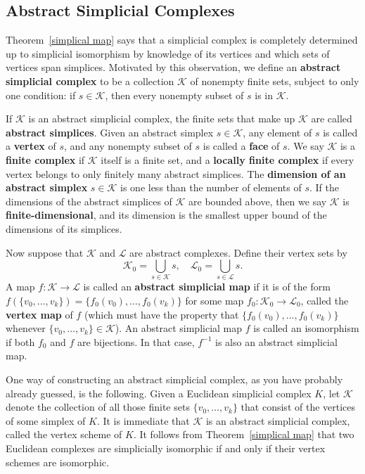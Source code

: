 \subsection{Abstract Simplicial Complexes}
Theorem~\ref{simplical map} says that a simplicial complex is completely determined up to simplicial isomorphism by knowledge of its vertices and which sets of vertices span simplices. Motivated by this observation, we define an \textbf{abstract simplicial complex} to be a collection $\mathcal{K}$ of nonempty finite sets, subject to only one condition: if $s\in\mathcal{K}$, then every nonempty subset of $s$ is in $\mathcal{K}$.\par
If $\mathcal{K}$ is an abstract simplicial complex, the finite sets that make up $\mathcal{K}$ are called \textbf{abstract simplices}. Given an abstract simplex $s\in\mathcal{K}$, any element of $s$ is called a \textbf{vertex} of $s$, and any nonempty subset of $s$ is called a \textbf{face} of $s$. We say $\mathcal{K}$ is a \textbf{finite complex} if $\mathcal{K}$ itself is a finite set, and a \textbf{locally finite complex} if every vertex belongs to only finitely many abstract simplices. The \textbf{dimension of an abstract simplex} $s\in\mathcal{K}$ is one less than the number of elements of $s$. If the dimensions of the abstract simplices of $\mathcal{K}$ are bounded above, then we say $\mathcal{K}$ is \textbf{finite-dimensional}, and its dimension is the smallest upper bound of the dimensions of its simplices.\par
Now suppose that $\mathcal{K}$ and $\mathcal{L}$ are abstract complexes. Define their vertex sets by
\[\mathcal{K}_0=\bigcup_{s\in\mathcal{K}}s,\quad \mathcal{L}_0=\bigcup_{s\in\mathcal{L}}s.\]
A map $f:\mathcal{K}\to\mathcal{L}$ is called an \textbf{abstract simplicial map} if it is of the form $f(\{v_0,\dots,v_k\})=\{f_0(v_0),\dots,f_0(v_k)\}$ for some map $f_0:\mathcal{K}_0\to\mathcal{L}_0$, called the \textbf{vertex map} of $f$ (which must have the property that $\{f_0(v_0),\dots,f_0(v_k)\}$ whenever $\{v_0,\dots,v_k\}\in\mathcal{K}$). An abstract simplicial map $f$ is called an isomorphism if both $f_0$ and $f$ are bijections. In that case, $f^{-1}$ is also an abstract simplicial map.\par
One way of constructing an abstract simplicial complex, as you have probably
already guessed, is the following. Given a Euclidean simplicial complex $K$, let $\mathcal{K}$ denote the collection of all those finite sets $\{v_0,\dots,v_k\}$ that consist of the vertices of some simplex of $K$. It is immediate that $\mathcal{K}$ is an abstract simplicial complex, called the vertex scheme of $K$. It follows from Theorem~\ref{simplical map} that two Euclidean complexes are simplicially isomorphic if and only if their vertex schemes are isomorphic.
